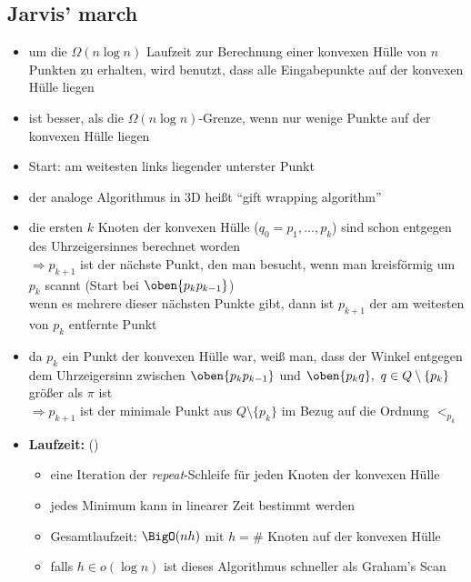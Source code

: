 \subsection{Jarvis' march}
\begin{itemize}[itemsep=0pt]
	\item um die $\Omega(n\log n)$ Laufzeit zur Berechnung einer konvexen Hülle von $n$ Punkten zu erhalten, wird benutzt, dass alle Eingabepunkte auf der konvexen Hülle liegen
	\item ist besser, als die $\Omega(n\log n)$-Grenze, wenn nur wenige Punkte auf der konvexen Hülle liegen
	\item Start: am weitesten links liegender unterster Punkt
	\item der analoge Algorithmus in 3D heißt ``gift wrapping algorithm''
	\item die ersten $k$ Knoten der konvexen Hülle ($q_0=p_1,\dots,p_k$) sind schon entgegen des Uhrzeigersinnes berechnet worden\\
	$\Rightarrow p_{k+1}$ ist der nächste Punkt, den man besucht, wenn man kreisförmig um $p_k$ scannt (Start bei $\oben{p_kp_{k-1}}$)\\
	wenn es mehrere dieser nächsten Punkte gibt, dann ist $p_{k+1}$ der am weitesten von $p_k$ entfernte Punkt
	\item da $p_k$ ein Punkt der konvexen Hülle war, weiß man, dass der Winkel entgegen dem Uhrzeigersinn zwischen $\oben{p_kp_{k-1}}$ und $\oben{p_kq},~q\in Q\setminus \{p_k\}$ größer als $\pi$ ist\\
	$\Rightarrow p_{k+1}$ ist der minimale Punkt aus $Q\setminus \{p_k\}$ im Bezug auf die Ordnung $<_{p_k}$
	\item \textbf{Laufzeit:} () %
		\begin{itemize}
			\item eine Iteration der \textit{repeat}-Schleife für jeden Knoten der konvexen Hülle
			\item jedes Minimum kann in linearer Zeit bestimmt werden
			\item Gesamtlaufzeit: $\BigO(nh)$ mit $h = \#$ Knoten auf der konvexen Hülle
			\item falls $h\in o(\log n)$ ist dieses Algorithmus schneller als Graham's Scan
		\end{itemize}
\end{itemize}